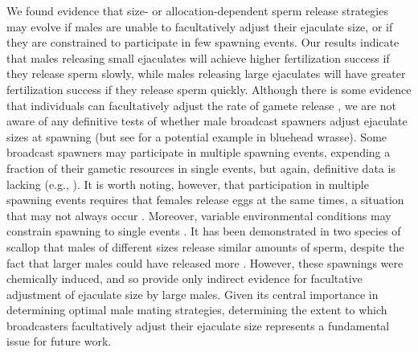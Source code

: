 \documentclass{article}
\begin{document}
We found evidence that size- or allocation-dependent sperm release strategies may evolve if males are unable to facultatively adjust their ejaculate size, or if they are constrained to participate in few spawning events. Our results indicate that males releasing small ejaculates will achieve higher fertilization success if they release sperm slowly, while males releasing large ejaculates will have greater fertilization success if they release sperm quickly. Although there is some evidence that individuals can facultatively adjust the rate of gamete release \citep{Marshall2004}, we are not aware of any definitive tests of whether male broadcast spawners adjust ejaculate sizes at spawning (but see \citealt{PetersenEtAl2001} for a potential example in bluehead wrasse). Some broadcast spawners may participate in multiple spawning events, expending a fraction of their gametic resources in single events, but again, definitive data is lacking (e.g., \citealt{Levitan1988,McEuan1988,LotterhosLevitan2011}). It is worth noting, however, that participation in multiple spawning events requires that females release eggs at the same times, a situation that may not always occur \citep{Olito2015,Olito2017}. Moreover, variable environmental conditions may constrain spawning to single events \citep{Olito2015,Olito2017}. It has been demonstrated in two species of scallop that males of different sizes release similar amounts of sperm, despite the fact that larger males could have released more \citep{Styan2003}. However, these spawnings were chemically induced, and so provide only indirect evidence for facultative adjustment of ejaculate size by large males. Given its central importance in determining optimal male mating strategies, determining the extent to which broadcasters facultatively adjust their ejaculate size represents a fundamental issue for future work.
\end{document}
